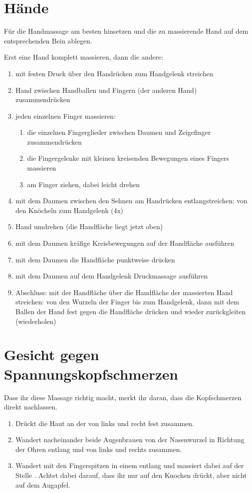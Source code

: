 \section{Hände}
Für die Handmassage am besten hinsetzen und die zu massierende Hand auf dem entsprechenden Bein ablegen.

Erst eine Hand komplett massieren, dann die andere:
\begin{enumerate}
	\item mit festen Druck über den Handrücken zum Handgelenk streichen
	\item Hand zwischen Handballen und Fingern (der anderen Hand) zu\-sam\-men\-drü\-cken
	\item jeden einzelnen Finger massieren:
		\begin{enumerate}
			\item die einzelnen Fingerglieder zwischen Daumen und Zeigefinger zu\-sam\-men\-drü\-cken
			\item die Fingergelenke mit kleinen kreisenden Bewegungen eines Fingers massieren
			\item am Finger ziehen, dabei leicht drehen
		\end{enumerate}
	\item mit dem Daumen zwischen den Sehnen am Handrücken entlangstreichen: von den Knöcheln zum Handgelenk (4x)
	\item Hand umdrehen (die Handfläche liegt jetzt oben)
	\item mit dem Daumen kräfige Kreisbewegungen auf der Handfläche ausführen
	\item mit dem Daumen die Handfläche punktweise drücken
	\item mit dem Daumen auf dem Handgelenk Druckmassage ausführen
	\item Abschluss: mit der Handfläche über die Handfläche der massierten Hand streichen: von den Wurzeln der Finger bis zum Handgelenk, dann mit dem Ballen der Hand fest gegen die Handfläche drücken und wieder zurückgleiten (wiederholen)
\end{enumerate}

\section{Gesicht gegen Spannungskopfschmerzen}

Dass ihr diese Massage richtig macht, merkt ihr daran, dass die Kopfschmerzen direkt nachlassen.

\begin{enumerate}
	\item Drückt die Haut an der  von links und recht fest zusammen.
	\item Wandert nacheinander beide Augenbrauen von der Nasenwurzel in Richtung der Ohren entlang und  von links und rechts zusammen. 
	\item Wandert mit den Fingerspitzen in einem  entlang und massiert dabei auf der Stelle . Achtet dabei darauf, dass ihr nur auf den Knochen drückt, aber nicht auf dem Augapfel.
\end{enumerate}
